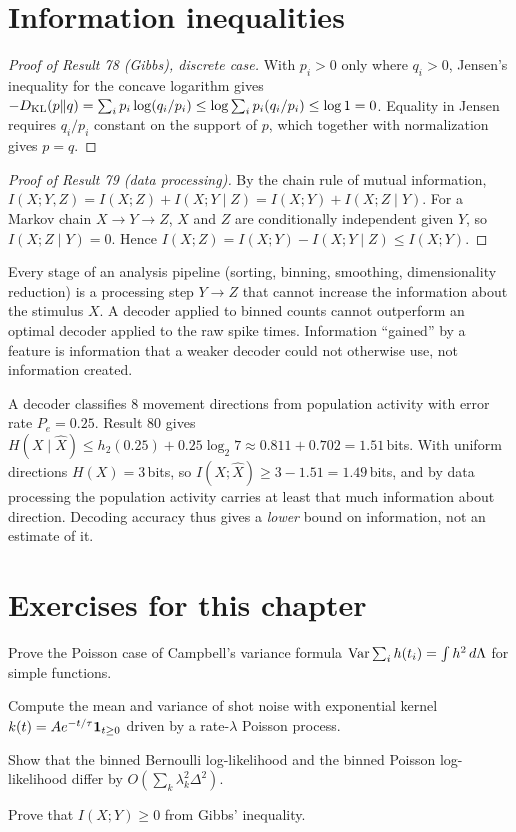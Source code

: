 \section{Information inequalities}
\begin{proof}[Proof of Result 78 (Gibbs), discrete case]
With $p_i>0$ only where $q_i>0$, Jensen's inequality for the concave
logarithm gives
$-D_{\mathrm{KL}}(p\|q)=\sum_ip_i\log(q_i/p_i)\le\log\sum_ip_i(q_i/p_i)\le\log1=0$.
Equality in Jensen requires $q_i/p_i$ constant on the support of $p$,
which together with normalization gives $p=q$.
\end{proof}
\begin{proof}[Proof of Result 79 (data processing)]
By the chain rule of mutual information,
$I(X;Y,Z)=I(X;Z)+I(X;Y\mid Z)=I(X;Y)+I(X;Z\mid Y)$. For a Markov chain
$X\to Y\to Z$, $X$ and $Z$ are conditionally independent given $Y$, so
$I(X;Z\mid Y)=0$. Hence $I(X;Z)=I(X;Y)-I(X;Y\mid Z)\le I(X;Y)$.
\end{proof}
Every stage of an analysis pipeline (sorting, binning, smoothing,
dimensionality reduction) is a processing step $Y\to Z$ that cannot
increase the information about the stimulus $X$. A decoder applied to
binned counts cannot outperform an optimal decoder applied to the raw
spike times. Information ``gained'' by a feature is information that a
weaker decoder could not otherwise use, not information created.

\begin{example}
A decoder classifies 8 movement directions from population activity
with error rate $P_e=0.25$. Result 80 gives
$H(X\mid\hat X)\le h_2(0.25)+0.25\log_2 7\approx0.811+0.702=1.51$\,bits.
With uniform directions $H(X)=3$\,bits, so
$I(X;\hat X)\ge3-1.51=1.49$\,bits, and by data processing the population
activity carries at least that much information about direction.
Decoding accuracy thus gives a \emph{lower} bound on information, not
an estimate of it.
\end{example}

\section*{Exercises for this chapter}
\begin{exercise}
Prove the Poisson case of Campbell's variance formula
$\operatorname{Var}\sum_ih(t_i)=\int h^2\,d\Lambda$ for simple functions.
\end{exercise}
\begin{exercise}
Compute the mean and variance of shot noise with exponential kernel
$k(t)=Ae^{-t/\tau}\mathbf{1}_{t\ge0}$ driven by a rate-$\lambda$ Poisson process.
\end{exercise}
\begin{exercise}
Show that the binned Bernoulli log-likelihood and the binned Poisson
log-likelihood differ by $O(\sum_k\lambda_k^2\Delta^2)$.
\end{exercise}
\begin{exercise}
Prove that $I(X;Y)\ge0$ from Gibbs' inequality.
\end{exercise}
